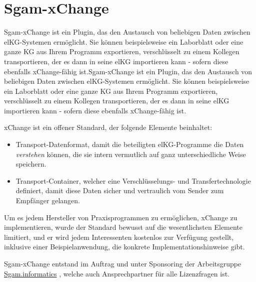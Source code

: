 

\section{Sgam-xChange}
Sgam-xChange ist ein Plugin, das den Austausch von beliebigen Daten zwischen elKG-Systemen ermöglicht. Sie können beispielsweise ein Laborblatt oder eine ganze KG aus Ihrem Programm exportieren, verschlüsselt zu einem Kollegen transportieren, der es dann in seine elKG importieren kann - sofern diese ebenfalls xChange-fähig ist.Sgam-xChange ist ein Plugin, das den Austausch von beliebigen Daten zwischen elKG-Systemen ermöglicht. Sie können beispielsweise ein Laborblatt oder eine ganze KG aus Ihrem Programm exportieren, verschlüsselt zu einem Kollegen transportieren, der es dann in seine elKG importieren kann - sofern diese ebenfalls xChange-fähig ist.

xChange ist ein offener Standard, der folgende Elemente beinhaltet:
\begin{itemize}
 \item Transport-Datenformat, damit die beteiligten elKG-Programme die Daten \textit{verstehen} können, die sie intern vermutlich auf ganz unterschiedliche Weise speichern.
\item Transport-Container, welcher eine Verschlüsselungs- und Transfertechnologie definiert, damit diese Daten sicher und vertraulich vom Sender zum Empfänger gelangen.
\end{itemize}
Um es jedem Hersteller von Praxisprogrammen zu ermöglichen, xChange zu implementieren, wurde der Standard bewusst auf die wesentlichsten Elemente limitiert, und er wird jedem Interessenten kostenlos zur Verfügung gestellt, inklusive einer Beispielanwendung, die konkrete Implementationshinweise gibt.

Sgam-xChange entstand im Auftrag und unter Sponsoring der Arbeitsgruppe \href{http://www.sgam.ch/informatics}{Sgam.informatics} , welche auch Ansprechpartner für alle Lizenzfragen ist.

